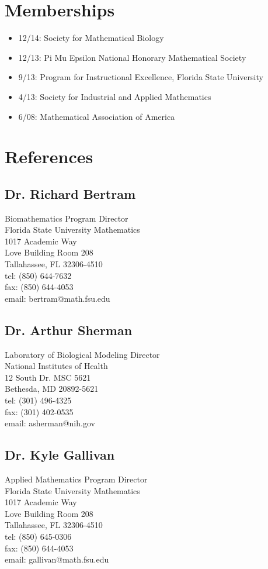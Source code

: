 \documentclass[11pt]{article}
\begin{document}
\section*{Memberships}
\label{sec:orgheadline23}
\begin{itemize}
\item 12/14: Society for Mathematical Biology\\
\item 12/13: Pi Mu Epsilon National Honorary Mathematical Society\\
\item 9/13: Program for Instructional Excellence, Florida State University\\
\item 4/13: Society for Industrial and Applied Mathematics\\
\item 6/08: Mathematical Association of America\\
\end{itemize}
\section*{References}
\label{sec:orgheadline27}
\subsection*{Dr. Richard Bertram}
\label{sec:orgheadline24}
Biomathematics Program Director\\
Florida State University Mathematics\\
1017 Academic Way\\
Love Building Room 208\\
Tallahassee, FL 32306-4510\\
tel: (850) 644-7632\\
fax: (850) 644-4053\\
email: bertram@math.fsu.edu\\
\subsection*{Dr. Arthur Sherman}
\label{sec:orgheadline25}
Laboratory of Biological Modeling Director\\
National Institutes of Health\\
12 South Dr. MSC 5621\\
Bethesda, MD 20892-5621\\
tel: (301) 496-4325\\
fax: (301) 402-0535\\
email: asherman@nih.gov\\
\subsection*{Dr. Kyle Gallivan}
\label{sec:orgheadline26}
Applied Mathematics Program Director\\
Florida State University Mathematics\\
1017 Academic Way\\
Love Building Room 208\\
Tallahassee, FL 32306-4510\\
tel: (850) 645-0306\\
fax: (850) 644-4053\\
email: gallivan@math.fsu.edu\\
\end{document}
